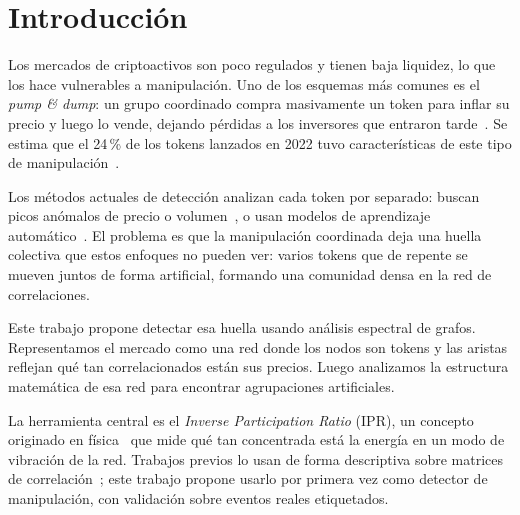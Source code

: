 \section{Introducción}

Los mercados de criptoactivos son poco regulados y tienen baja liquidez, lo
que los hace vulnerables a manipulación. Uno de los esquemas más comunes es el
\emph{pump \& dump}: un grupo coordinado compra masivamente un token para
inflar su precio y luego lo vende, dejando pérdidas a los inversores que
entraron tarde~\cite{xu2019anatomy}. Se estima que el 24\,\% de los tokens
lanzados en 2022 tuvo características de este tipo de
manipulación~\cite{lamorgia2023}.

Los métodos actuales de detección analizan cada token por separado: buscan
picos anómalos de precio o volumen~\cite{kamps2018}, o usan modelos de
aprendizaje automático~\cite{hamrick2021}. El problema es que la manipulación
coordinada deja una huella colectiva que estos enfoques no pueden ver: varios
tokens que de repente se mueven juntos de forma artificial, formando una
comunidad densa en la red de correlaciones.

Este trabajo propone detectar esa huella usando análisis espectral de grafos.
Representamos el mercado como una red donde los nodos son tokens y las aristas
reflejan qué tan correlacionados están sus precios. Luego analizamos la
estructura matemática de esa red para encontrar agrupaciones artificiales.

La herramienta central es el \emph{Inverse Participation Ratio} (IPR),
un concepto originado en física~\cite{anderson1958absence} que mide qué tan
concentrada está la energía en un modo de vibración de la red. Trabajos
previos lo usan de forma descriptiva sobre matrices de
correlación~\cite{plerou1999,nobi2013}; este trabajo propone usarlo por primera
vez como detector de manipulación, con validación sobre eventos reales
etiquetados.
